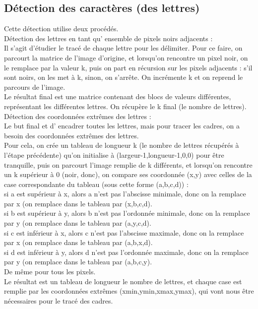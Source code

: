 \documentclass [french,12pt]{article}
\begin{document}
\subsection{Détection des caractères (des lettres)}

Cette détection utilise deux procédés.
\\
Détection des lettres en tant qu' ensemble de pixels noirs adjacents :
\\
        Il s'agit d'étudier le tracé de chaque lettre pour les délimiter. Pour ce faire, on parcourt la matrice de l'image d'origine, et lorsqu'on rencontre un pixel noir, on le remplace par la valeur k, puis on part en récursion sur les pixels adjacents : s'il sont noirs, on les met à k, sinon, on s'arrête. On incrémente k et on reprend le parcours de l'image.
\\
                     Le résultat final est une matrice contenant des blocs de valeurs différentes, représentant les différentes lettres. On récupère le k final (le nombre de lettres).
\\
Détection des coordonnées extrêmes des lettres :
\\
          Le but final et d' encadrer toutes les lettres, mais pour tracer les cadres, on a besoin des coordonnées extrêmes des lettres.
\\
          Pour cela, on crée un tableau de longueur k (le nombre de lettres récupérés à l'étape précédente) qu'on initialise à (largeur-1,longueur-1,0,0)  pour être tranquille, puis on parcourt l'image remplie de k différents, et lorsqu'on rencontre un k supérieur à 0 (noir, donc), on compare ses coordonnée (x,y) avec celles de la case correspondante du tableau (sous cette forme (a,b,c,d)) : 
\\
si a est supérieur à x, alors a n'est pas l'abscisse minimale, donc on la remplace par x (on remplace dans le tableau par (x,b,c,d).
\\
si b est supérieur à y, alors b n'est pas l'ordonnée minimale, donc on la remplace par y (on remplace dans le tableau par (a,y,c,d).
\\
si c est inférieur à x, alors c n'est pas l'abscisse maximale, donc on la remplace par x (on remplace dans le tableau par (a,b,x,d).
\\
si d est inférieur à y, alors d n'est pas l'ordonnée maximale, donc on la remplace par y (on remplace dans le tableau par (a,b,c,y).
\\
		De même pour tous les pixels.
\\
		Le résultat est un tableau de longueur le nombre de lettres, et chaque case est 	remplie par les coordonnées extrêmes (xmin,ymin,xmax,ymax), qui vont nous être nécessaires pour le tracé des cadres.
\end{document}
